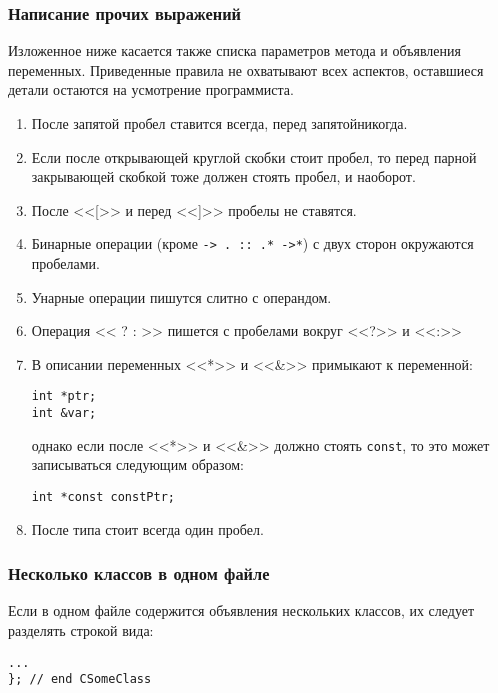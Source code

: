 {{{\subsubsection{Написание прочих выражений}

Изложенное ниже касается также списка параметров метода и объявления переменных. Приведенные правила не охватывают всех аспектов, оставшиеся детали остаются на усмотрение программиста.

\begin{enumerate}
\item После запятой пробел ставится всегда, перед запятой\mdash никогда.
\item Если после открывающей круглой скобки стоит пробел, то перед парной закрывающей скобкой тоже должен стоять пробел, и наоборот.
\item После <<[>> и перед <<]>> пробелы не ставятся.
\item Бинарные операции (кроме \lstinline|-> . :: .* ->*|) с двух сторон окружаются пробелами.
\item Унарные операции пишутся слитно с операндом.
\item Операция << ? : >>  пишется с пробелами вокруг <<?>> и <<:>>
\item В описании переменных <<*>> и <<\&>> примыкают к переменной:
\begin{lstlisting}[frame=single,numbers=none]
int *ptr;
int &var;
\end{lstlisting}
однако если после <<*>> и <<\&>> должно стоять \lstinline|const|, то это может записываться следующим образом:
\begin{lstlisting}[frame=single,numbers=none]
int *const constPtr;
\end{lstlisting}
\item После типа стоит всегда один пробел.
\end{enumerate}

\newpage
\subsubsection{Несколько классов в одном файле}\label{subsubsection:Несколько_классов_в_одном_файле}

Если в одном файле содержится объявления нескольких классов, их следует разделять строкой вида:

\begin{lstlisting}[frame=single,numbers=none]
...
}; // end CSomeClass


\end{lstlisting}}}}
